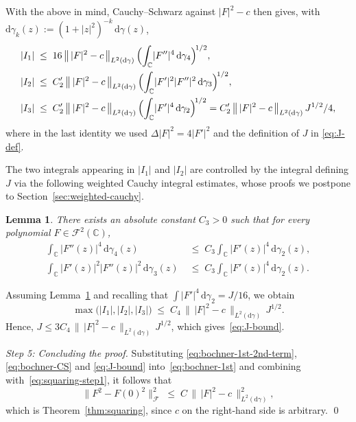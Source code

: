 \documentclass[11pt]{amsart}
\newtheorem{lemma}[theorem]{Lemma}
\theoremstyle{remark}
\newcommand{\C}{\mathbb{C}}
\newcommand{\abs}[1]{\lvert #1 \rvert}
\newcommand{\norm}[1]{\lVert #1 \rVert}
\newcommand{\dd}{\mathrm{d}}
\begin{document}
With the above in mind, Cauchy--Schwarz against $\abs{F}^2 - c$ then gives, with $\dd\gamma_k(z)
:= (1+\abs{z}^2)^{-k}\,\dd\gamma(z)$,
\begin{align*}
\abs{I_1}
&\;\le\; 16\,\bigl\|\,\abs{F}^2-c\,\bigr\|_{L^2(\dd\gamma)}\,
\Bigl(\int_{\C}\abs{F''}^4\,\dd\gamma_4\Bigr)^{\!1/2}, \\
\abs{I_2}
&\;\le\; C_2'\,\bigl\|\,\abs{F}^2-c\,\bigr\|_{L^2(\dd\gamma)}\,
\Bigl(\int_{\C}\abs{F'}^2\abs{F''}^2\,\dd\gamma_3\Bigr)^{\!1/2}, \\
\abs{I_3}
&\;\le\; C_2'\,\bigl\|\,\abs{F}^2-c\,\bigr\|_{L^2(\dd\gamma)}\,
\Bigl(\int_{\C}\abs{F'}^4\,\dd\gamma_2\Bigr)^{\!1/2}
= C_2'\,\bigl\|\,\abs{F}^2-c\,\bigr\|_{L^2(\dd\gamma)}\, J^{1/2}/4,
\end{align*}
where in the last identity we used $\Delta\abs{F}^2 = 4\abs{F'}^2$ and the definition
 of $J$ in \eqref{eq:J-def}.

\medskip

The two integrals appearing in $\abs{I_1}$ and $\abs{I_2}$ are controlled
by the integral defining $J$ via the following weighted Cauchy integral
estimates, whose proofs we postpone to Section~\ref{sec:weighted-cauchy}.

\begin{lemma}\label{lem:weighted-cauchy}
There exists an absolute constant $C_3 > 0$ such that for every polynomial
$F \in \mathcal{F}^2(\C)$,
\begin{align*}
\int_{\C} \abs{F''(z)}^4\, \dd\gamma_4(z)
&\;\le\; C_3 \int_{\C} \abs{F'(z)}^4\, \dd\gamma_2(z),
\\
\int_{\C} \abs{F'(z)}^2\abs{F''(z)}^2\, \dd\gamma_3(z)
&\;\le\; C_3 \int_{\C} \abs{F'(z)}^4\, \dd\gamma_2(z).
\label{eq:cauchy-mixed}
\end{align*}
\end{lemma}

Assuming Lemma~\ref{lem:weighted-cauchy} and recalling that $\int\abs{F'}^4
\,\dd\gamma_2 = J/16$, we obtain
\[
\max\bigl(\abs{I_1},\abs{I_2},\abs{I_3}\bigr)
\;\le\;
C_4\,\bigl\|\,\abs{F}^2 - c\,\bigr\|_{L^2(\dd\gamma)}\, J^{1/2}.
\]
Hence, $J \le 3 C_4\,\bigl\|\,\abs{F}^2-c\,\bigr\|_{L^2(\dd\gamma)}\,
J^{1/2}$, which gives~\eqref{eq:J-bound}. 

\medskip
\noindent\emph{Step 5: Concluding the proof.}\;
Substituting \eqref{eq:bochner-1st-2nd-term},
\eqref{eq:bochner-CS} and \eqref{eq:J-bound}
into~\eqref{eq:bochner-1st} and combining with~\eqref{eq:squaring-step1}, it follows that
\[
\norm{F^2 - F(0)^2}_{\mathcal{F}}^2
\;\le\;
C\,\bigl\|\,\abs{F}^2 - c\,\bigr\|_{L^2(\dd\gamma)}^2,
\]
which is Theorem~\ref{thm:squaring}, since $c$ on the right-hand side is arbitrary. 
\qed
\end{document}

